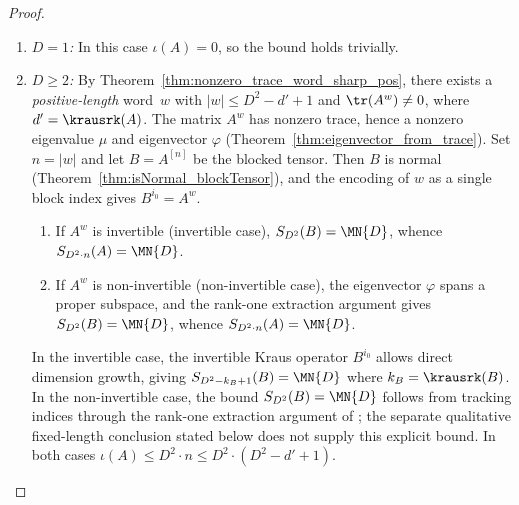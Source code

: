 \begin{proof}
    \leanok
    \begin{enumerate}
        \item \emph{$D = 1$:} In this case $\iota(A) = 0$, so the bound
              holds trivially.
        \item \emph{$D \ge 2$:}
              By Theorem~\ref{thm:nonzero_trace_word_sharp_pos},
              there exists a \emph{positive-length} word~$w$ with
              $|w| \le D^2 - d' + 1$ and $\tr(A^w) \neq 0$,
              where $d' = \krausrk(A)$.
              The matrix $A^w$ has nonzero trace,
              hence a nonzero eigenvalue $\mu$ and eigenvector $\varphi$
              (Theorem~\ref{thm:eigenvector_from_trace}).
              Set $n = |w|$ and let $B = A^{[n]}$ be the blocked tensor.
              Then $B$ is normal (Theorem~\ref{thm:isNormal_blockTensor}),
              and the encoding of $w$ as a single block index gives
              $B^{i_0} = A^w$.
              \begin{enumerate}
                  \item If $A^w$ is invertible (invertible case),
                        $S_{D^2}(B) = \MN{D}$, whence
                        $S_{D^2 \cdot n}(A) = \MN{D}$.
                  \item If $A^w$ is non-invertible (non-invertible case),
                        the eigenvector $\varphi$ spans a proper subspace,
                        and the rank-one extraction argument gives
                        $S_{D^2}(B) = \MN{D}$, whence
                        $S_{D^2 \cdot n}(A) = \MN{D}$.
              \end{enumerate}
              In the invertible case, the invertible Kraus operator $B^{i_0}$ allows
              direct dimension growth, giving
              $S_{D^2 - k_B + 1}(B) = \MN{D}$ where
              $k_B = \krausrk(B)$.
              In the non-invertible case, the bound $S_{D^2}(B) = \MN{D}$ follows
              from tracking indices through the rank-one extraction argument of
              \cite[Lemma~2(b)]{Sanz2010Quantum}; the separate qualitative
              fixed-length conclusion stated below does not supply this
              explicit bound.
              In both cases $\iota(A) \le D^2 \cdot n \le D^2 \cdot (D^2 - d' + 1)$.
    \end{enumerate}
\end{proof}

